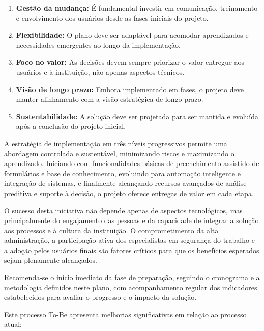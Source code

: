\documentclass[12pt,a4paper]{article}
\begin{document}
\begin{enumerate}
    \item \textbf{Gestão da mudança:} É fundamental investir em comunicação, treinamento e envolvimento dos usuários desde as fases iniciais do projeto.
    
    \item \textbf{Flexibilidade:} O plano deve ser adaptável para acomodar aprendizados e necessidades emergentes ao longo da implementação.
    
    \item \textbf{Foco no valor:} As decisões devem sempre priorizar o valor entregue aos usuários e à instituição, não apenas aspectos técnicos.
    
    \item \textbf{Visão de longo prazo:} Embora implementado em fases, o projeto deve manter alinhamento com a visão estratégica de longo prazo.
    
    \item \textbf{Sustentabilidade:} A solução deve ser projetada para ser mantida e evoluída após a conclusão do projeto inicial.
\end{enumerate}

A estratégia de implementação em três níveis progressivos permite uma abordagem controlada e sustentável, minimizando riscos e maximizando o aprendizado. Iniciando com funcionalidades básicas de preenchimento assistido de formulários e base de conhecimento, evoluindo para automação inteligente e integração de sistemas, e finalmente alcançando recursos avançados de análise preditiva e suporte à decisão, o projeto oferece entregas de valor em cada etapa.

O sucesso desta iniciativa não depende apenas de aspectos tecnológicos, mas principalmente do engajamento das pessoas e da capacidade de integrar a solução aos processos e à cultura da instituição. O comprometimento da alta administração, a participação ativa dos especialistas em segurança do trabalho e a adoção pelos usuários finais são fatores críticos para que os benefícios esperados sejam plenamente alcançados.

Recomenda-se o início imediato da fase de preparação, seguindo o cronograma e a metodologia definidos neste plano, com acompanhamento regular dos indicadores estabelecidos para avaliar o progresso e o impacto da solução.

Este processo To-Be apresenta melhorias significativas em relação ao processo atual:
\end{document}
